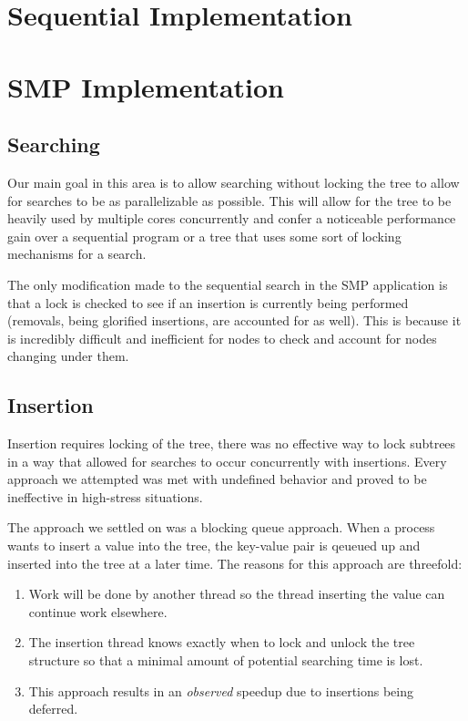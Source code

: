 \documentclass[conference]{IEEEtran}
\begin{document}
\section{Sequential Implementation}

\section{SMP Implementation}
\subsection{Searching}
Our main goal in this area is to allow searching without locking the tree to
allow for searches to be as parallelizable as possible. This will allow for
the tree to be heavily used by multiple cores concurrently and confer a
noticeable performance gain over a sequential program or a tree that uses some
sort of locking mechanisms for a search.

The only modification made to the sequential search in the SMP application is
that a lock is checked to see if an insertion is currently being performed 
(removals, being glorified insertions, are accounted for as well). This is 
because it is incredibly difficult and inefficient for nodes to check and
account for nodes changing under them.
\subsection{Insertion}
Insertion requires locking of the tree, there was no effective way to lock 
subtrees in a way that allowed for searches to occur concurrently with
insertions. Every approach we attempted was met with undefined behavior and
proved to be ineffective in high-stress situations.

The approach we settled on was a blocking queue approach. When a process wants 
to insert a value into the tree, the key-value pair is qeueued up and inserted
into the tree at a later time. The reasons for this approach are threefold:
\begin{enumerate}
\item Work will be done by another thread so the thread inserting the value can
continue work elsewhere.
\item The insertion thread knows exactly when to lock and unlock the tree
structure so that a minimal amount of potential searching time is lost.
\item This approach results in an \emph{observed} speedup due to insertions being
deferred.
\end{enumerate}
\end{document}
